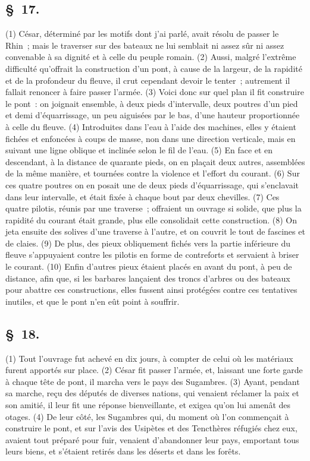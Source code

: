 \documentclass[french,twoside]{book} %
\begin{document}
\subsection[{§ 17.}]{ \textsc{§ 17.} }
\noindent (1) César, déterminé par les motifs dont j’ai parlé, avait résolu de passer le Rhin ; mais le traverser sur des bateaux ne lui semblait ni assez sûr ni assez convenable à sa dignité et à celle du peuple romain. (2) Aussi, malgré l’extrême difficulté qu’offrait la construction d’un pont, à cause de la largeur, de la rapidité et de la profondeur du fleuve, il crut cependant devoir le tenter ; autrement il fallait renoncer à faire passer l’armée. (3) Voici donc sur quel plan il fit construire le pont : on joignait ensemble, à deux pieds d’intervalle, deux poutres d’un pied et demi d’équarrissage, un peu aiguisées par le bas, d’une hauteur proportionnée à celle du fleuve. (4) Introduites dans l’eau à l’aide des machines, elles y étaient fichées et enfoncées à coups de masse, non dans une direction verticale, mais en suivant une ligne oblique et inclinée selon le fil de l’eau. (5) En face et en descendant, à la distance de quarante pieds, on en plaçait deux autres, assemblées de la même manière, et tournées contre la violence et l’effort du courant. (6) Sur ces quatre poutres on en posait une de deux pieds d’équarrissage, qui s’enclavait dans leur intervalle, et était fixée à chaque bout par deux chevilles. (7) Ces quatre pilotis, réunis par une traverse ; offraient un ouvrage si solide, que plus la rapidité du courant était grande, plus elle consolidait cette construction. (8) On jeta ensuite des solives d’une traverse à l’autre, et on couvrit le tout de fascines et de claies. (9) De plus, des pieux obliquement fichés vers la partie inférieure du fleuve s’appuyaient contre les pilotis en forme de contreforts et servaient à briser le courant. (10) Enfin d’autres pieux étaient placés en avant du pont, à peu de distance, afin que, si les barbares lançaient des troncs d’arbres ou des bateaux pour abattre ces constructions, elles fussent ainsi protégées contre ces tentatives inutiles, et que le pont n’en eût point à souffrir.
\subsection[{§ 18.}]{ \textsc{§ 18.} }
\noindent (1) Tout l’ouvrage fut achevé en dix jours, à compter de celui où les matériaux furent apportés sur place. (2) César fit passer l’armée, et, laissant une forte garde à chaque tête de pont, il marcha vers le pays des Sugambres. (3) Ayant, pendant sa marche, reçu des députés de diverses nations, qui venaient réclamer la paix et son amitié, il leur fit une réponse bienveillante, et exigea qu’on lui amenât des otages. (4) De leur côté, les Sugambres qui, du moment où l’on commençait à construire le pont, et sur l’avis des Usipètes et des Tencthères réfugiés chez eux, avaient tout préparé pour fuir, venaient d’abandonner leur pays, emportant tous leurs biens, et s’étaient retirés dans les déserts et dans les forêts.
\end{document}
